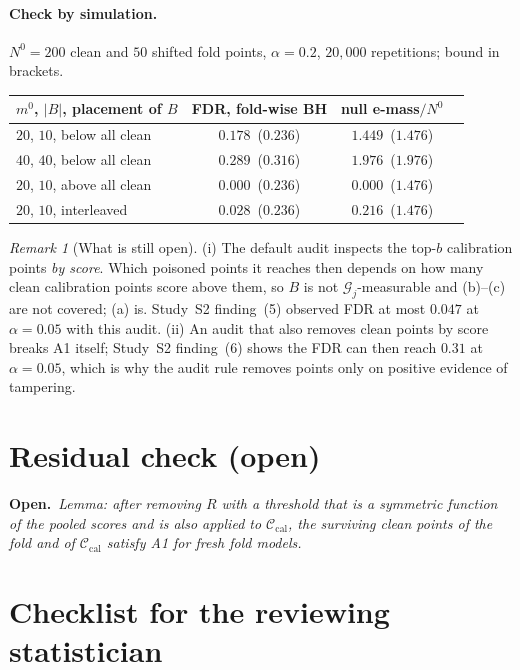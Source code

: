 \documentclass[11pt]{article}
\theoremstyle{definition}
\theoremstyle{remark}
\newtheorem{remark}{Remark}
\newcommand{\Cal}{\mathcal{C}_{\mathrm{cal}}}
\newcommand{\G}{\mathcal{G}}
\newcommand{\1}{\mathbf{1}}
\newcommand{\todo}[1]{\par\noindent\textbf{Open.}~\emph{#1}\par}
\begin{document}
\paragraph{Check by simulation.} $N^0=200$ clean and $50$ shifted fold points, $\alpha=0.2$, $20{,}000$
repetitions; bound in brackets.

\begin{center}
\begin{tabular}{lccc}
$m^0$, $|B|$, placement of $B$ & FDR, fold-wise BH & null e-mass$/N^0$\\\hline
$20$, $10$, below all clean & $0.178$ \,($0.236$) & $1.449$ \,($1.476$)\\
$40$, $40$, below all clean & $0.289$ \,($0.316$) & $1.976$ \,($1.976$)\\
$20$, $10$, above all clean & $0.000$ \,($0.236$) & $0.000$ \,($1.476$)\\
$20$, $10$, interleaved & $0.028$ \,($0.236$) & $0.216$ \,($1.476$)\\
\end{tabular}
\end{center}

\begin{remark}[What is still open]
(i) The default audit inspects the top-$b$ calibration points \emph{by score}. Which poisoned
points it reaches then depends on how many clean calibration points score above them, so $B$ is
not $\G_j$-measurable and (b)--(c) are not covered; (a) is. Study~S2 finding~(5) observed FDR at
most $0.047$ at $\alpha=0.05$ with this audit. (ii) An audit that also removes clean points by score
breaks A1 itself; Study~S2 finding~(6) shows the FDR can then reach $0.31$ at $\alpha=0.05$, which is
why the audit rule removes points only on positive evidence of tampering.
\end{remark}

\section{Residual check (open)}

\todo{Lemma: after removing $R$ with a threshold that is a symmetric function of the pooled scores
and is also applied to $\Cal$, the surviving clean points of the fold and of $\Cal$ satisfy A1
for fresh fold models.}

\section*{Checklist for the reviewing statistician}
\end{document}
